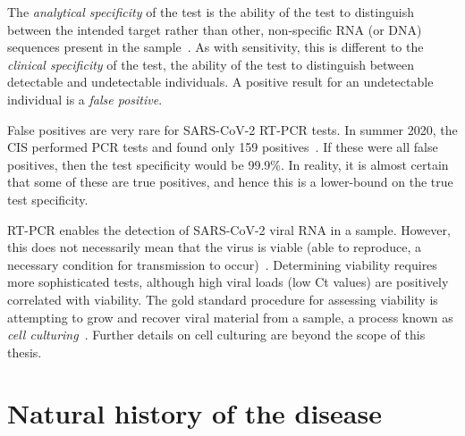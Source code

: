 \documentclass[thesis.tex]{subfiles}
\begin{document}
The \emph{analytical specificity} of the test is the ability of the test to distinguish between the intended target rather than other, non-specific RNA (or DNA) sequences present in the sample~\autocite{bustinMIQE}.
As with sensitivity, this is different to the \emph{clinical specificity} of the test, the ability of the test to distinguish between detectable and undetectable individuals.
A positive result for an undetectable individual is a \emph{false positive}.

False positives are very rare for SARS-CoV-2 RT-PCR tests.
In summer 2020, the CIS performed  PCR tests and found only 159 positives~\autocite[section 5]{cisMethodsONS}.
If these were all false positives, then the test specificity would be 99.9\%.
In reality, it is almost certain that some of these are true positives, and hence this is a lower-bound on the true test specificity.

RT-PCR enables the detection of SARS-CoV-2 viral RNA in a sample.
However, this does not necessarily mean that the virus is viable (\ie able to reproduce, a necessary condition for transmission to occur)~\autocite{puhachSARSCoV2}.
Determining viability requires more sophisticated tests, although high viral loads (low Ct values) are positively correlated with viability.
The gold standard procedure for assessing viability is attempting to grow and recover viral material from a sample, a process known as \emph{cell culturing}~\autocite{singanayagamDuration,puhachSARSCoV2,hakkiOnset}.
Further details on cell culturing are beyond the scope of this thesis.

\section{Natural history of the disease} \label{biology-data:sec:natural-history}
\end{document}
